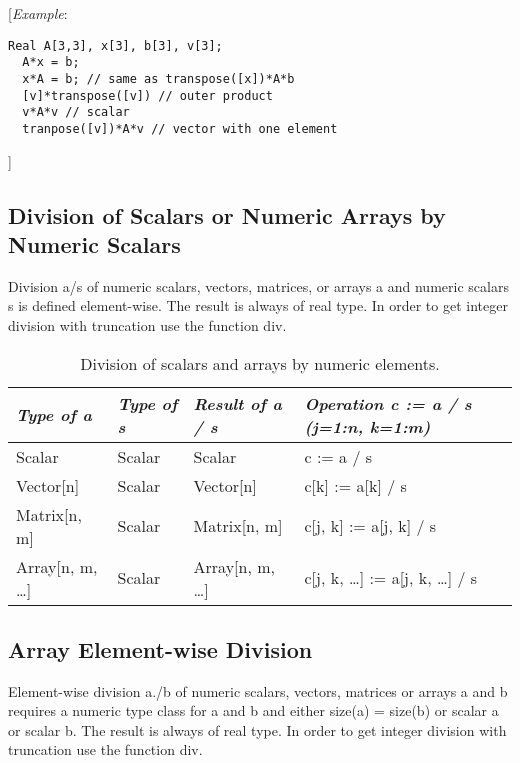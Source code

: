 {[}\emph{Example}:

\begin{lstlisting}[language=modelica]
  Real A[3,3], x[3], b[3], v[3];
  A*x = b;
  x*A = b; // same as transpose([x])*A*b
  [v]*transpose([v]) // outer product
  v*A*v // scalar
  tranpose([v])*A*v // vector with one element
\end{lstlisting}
{]}

\subsection{Division of Scalars or Numeric Arrays by Numeric Scalars}

Division a/s of numeric scalars, vectors, matrices, or arrays a and
numeric scalars s is defined element-wise. The result is always of real
type. In order to get integer division with truncation use the function
div.

\begin{longtable}[]{|l|l|l|l|}
\caption{Division of scalars and arrays by numeric elements.}\\
\hline \endhead
\emph{Type of a} & \emph{Type of s} & \emph{Result of a / s} &
\emph{Operation c := a / s (j=1:n, k=1:m)}\\ \hline
Scalar & Scalar & Scalar & c := a / s\\ \hline
Vector{[}n{]} & Scalar & Vector{[}n{]} & c{[}k{]} := a{[}k{]} /
s\\ \hline
Matrix{[}n, m{]} & Scalar & Matrix{[}n, m{]} & c{[}j, k{]} := a{[}j,
k{]} / s\\ \hline
Array{[}n, m, \ldots{}{]} & Scalar & Array{[}n, m, \ldots{}{]} & c{[}j,
k, \ldots{}{]} := a{[}j, k, \ldots{}{]} / s\\ \hline

\end{longtable}

\subsection{Array Element-wise Division}

Element-wise division a./b of numeric scalars, vectors, matrices or
arrays a and b requires a numeric type class for a and b and either
size(a) = size(b) or scalar a or scalar b. The result is always of real
type. In order to get integer division with truncation use the function
div.


